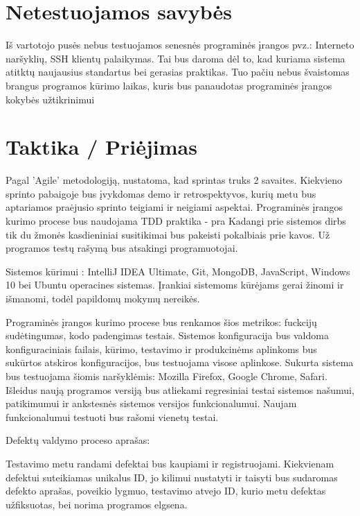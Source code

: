 \documentclass{VUMIFPSkursinis}
\begin{document}
    \section{Netestuojamos savybės}

    Iš vartotojo pusės nebus testuojamos senesnės programinės įrangos pvz.: Interneto naršyklių, SSH klientų palaikymas.
    Tai bus daroma dėl to, kad kuriama sistema atitktų naujausius standartus bei gerasias praktikas.
    Tuo pačiu nebus švaistomas brangus programos kūrimo laikas, kuris bus panaudotas programinės įrangos kokybės užtikrinimui


    \section{Taktika / Priėjimas}

    Pagal 'Agile' metodologiją, nustatoma, kad sprintas truks 2 savaites.
    Kiekvieno sprinto pabaigoje bus įvykdomas demo ir retrospektyvos,
     kurių metu bus aptariamos praėjusio sprinto teigiami ir neigiami aspektai.
    Programinės įrangos kurimo procese bus naudojama TDD praktika - pra
    Kadangi prie sistemos dirbs tik du žmonės kasdieniniai susitikimai bus pakeisti pokalbiais prie kavos.
    Už programos testų rašymą bus atsakingi programuotojai.


    Sistemos kūrimui : IntelliJ IDEA Ultimate, Git, MongoDB, JavaScript, Windows 10 bei Ubuntu operacines sistemas.
    Įrankiai sistemoms kūrėjams gerai žinomi ir išmanomi, todėl papildomų mokymų nereikės. 

    Programinės įrangos kurimo procese bus renkamos šios metrikos: fuckcijų sudėtingumas, kodo padengimas testais.
    Sistemos konfiguracija bus valdoma konfiguraciniais failais,
     kūrimo, testavimo ir produkcinėms aplinkoms bus sukūrtos atskiros konfiguracijos, bus testuojama visose aplinkose.
    Sukurta sistema bus testuojama šiomis naršyklėmis: Mozilla Firefox, Google Chrome, Safari.
    Išleidus naują programos versiją bus atliekami regresiniai testai sistemos našumui,
     patikimumui ir ankstesnės sistemos versijos funkcionalumui.
    Naujam funkcionalumui testuoti bus rašomi vienetų testai. 

    Defektų valdymo proceso aprašas:

    Testavimo metu randami defektai bus kaupiami ir registruojami. 
    Kiekvienam defektui suteikiamas unikalus ID, jo kilimui nustatyti ir taisyti bus sudaromas defekto aprašas, poveikio lygmuo, 
     testavimo atvejo ID, kurio metu defektas užfiksuotas, bei norima programos elgsena.
\end{document}
